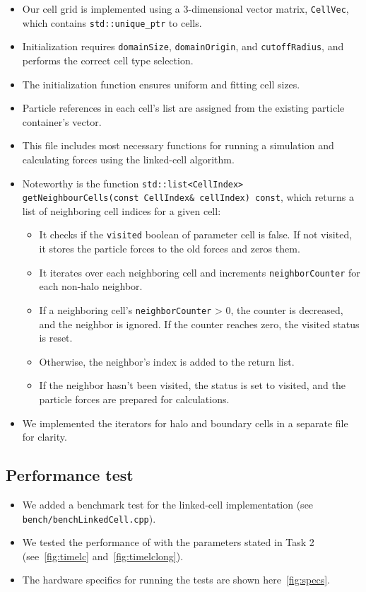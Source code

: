 \documentclass{article}
\begin{document}
\begin{itemize}
    \item Our cell grid is implemented using a 3-dimensional vector matrix, \texttt{CellVec}, which contains \texttt{std::unique\_ptr} to cells.
    \item Initialization requires \texttt{domainSize}, \texttt{domainOrigin}, and \texttt{cutoffRadius}, and performs the correct cell type selection.
    \item The initialization function ensures uniform and fitting cell sizes.
    \item Particle references in each cell's list are assigned from the existing particle container's vector.
    \item This file includes most necessary functions for running a simulation and calculating forces using the linked-cell algorithm.
    \item Noteworthy is the function \texttt{std::list<CellIndex> getNeighbourCells(const CellIndex\& cellIndex) const}, which returns a list of neighboring cell indices for a given cell:
    \begin{itemize}
        \item It checks if the \texttt{visited} boolean of parameter cell is false. If not visited, it stores the particle forces to the old forces and zeros them.
        \item It iterates over each neighboring cell and increments \texttt{neighborCounter} for each non-halo neighbor.
        \item If a neighboring cell's \texttt{neighborCounter} > 0, the counter is decreased, and the neighbor is ignored. If the counter reaches zero, the visited status is reset.
        \item Otherwise, the neighbor's index is added to the return list.
        \item If the neighbor hasn't been visited, the status is set to visited, and the particle forces are prepared for calculations.
    \end{itemize}
    \item We implemented the iterators for halo and boundary cells in a separate file for clarity.
\end{itemize}

\subsection{Performance test}
\label{subsec:perflc}

\begin{itemize}
    \item We added a benchmark test for the linked-cell implementation \newline(see \texttt{bench/benchLinkedCell.cpp}).
    \item We tested the performance of with the parameters stated in Task 2 \newline(see\ \ref{fig:timelc} and\ \ref{fig:timelclong}).
    \item The hardware specifics for running the tests are shown here\ \ref{fig:specs}.
\end{itemize}
\end{document}
